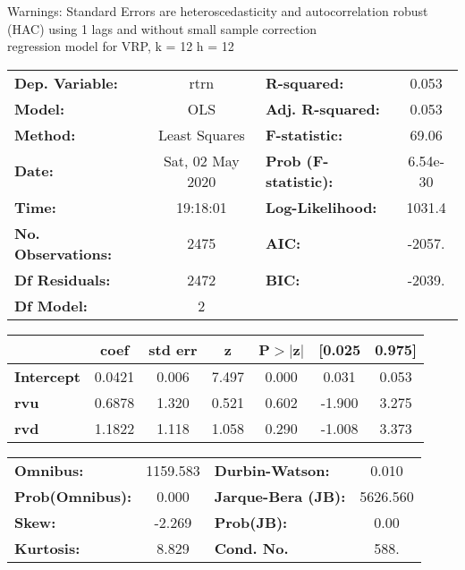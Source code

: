 Warnings: \newline
 [1] Standard Errors are heteroscedasticity and autocorrelation robust (HAC) using 1 lags and without small sample correction\\ 

regression model for VRP, k = 12 h = 12\begin{center}
\begin{tabular}{lclc}
\toprule
\textbf{Dep. Variable:}    &       rtrn       & \textbf{  R-squared:         } &     0.053   \\
\textbf{Model:}            &       OLS        & \textbf{  Adj. R-squared:    } &     0.053   \\
\textbf{Method:}           &  Least Squares   & \textbf{  F-statistic:       } &     69.06   \\
\textbf{Date:}             & Sat, 02 May 2020 & \textbf{  Prob (F-statistic):} &  6.54e-30   \\
\textbf{Time:}             &     19:18:01     & \textbf{  Log-Likelihood:    } &    1031.4   \\
\textbf{No. Observations:} &        2475      & \textbf{  AIC:               } &    -2057.   \\
\textbf{Df Residuals:}     &        2472      & \textbf{  BIC:               } &    -2039.   \\
\textbf{Df Model:}         &           2      & \textbf{                     } &             \\
\bottomrule
\end{tabular}
\begin{tabular}{lcccccc}
                   & \textbf{coef} & \textbf{std err} & \textbf{z} & \textbf{P$> |$z$|$} & \textbf{[0.025} & \textbf{0.975]}  \\
\midrule
\textbf{Intercept} &       0.0421  &        0.006     &     7.497  &         0.000        &        0.031    &        0.053     \\
\textbf{rvu}       &       0.6878  &        1.320     &     0.521  &         0.602        &       -1.900    &        3.275     \\
\textbf{rvd}       &       1.1822  &        1.118     &     1.058  &         0.290        &       -1.008    &        3.373     \\
\bottomrule
\end{tabular}
\begin{tabular}{lclc}
\textbf{Omnibus:}       & 1159.583 & \textbf{  Durbin-Watson:     } &    0.010  \\
\textbf{Prob(Omnibus):} &   0.000  & \textbf{  Jarque-Bera (JB):  } & 5626.560  \\
\textbf{Skew:}          &  -2.269  & \textbf{  Prob(JB):          } &     0.00  \\
\textbf{Kurtosis:}      &   8.829  & \textbf{  Cond. No.          } &     588.  \\
\bottomrule
\end{tabular}
\end{center}

